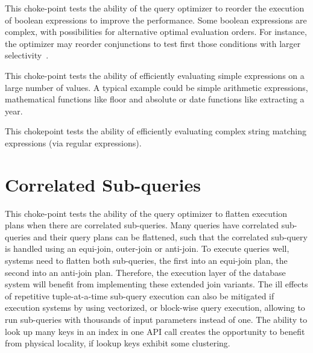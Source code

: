 


This choke-point tests the ability of the query optimizer to reorder the execution of boolean expressions to improve the performance. Some boolean expressions are complex, with possibilities for alternative optimal evaluation orders.
For instance, the optimizer may reorder conjunctions to test first those conditions with larger selectivity~\cite{DBLP:conf/vldb/Moerkotte98}.




This choke-point tests the ability of efficiently evaluating simple expressions on a large number of values. A typical example could be simple arithmetic expressions, mathematical functions like floor and absolute or date functions like extracting a year.




This chokepoint tests the ability of efficiently evaluating complex string
matching expressions (\eg via regular expressions).

%


\section{Correlated Sub-queries}


This choke-point tests the ability of the query optimizer to flatten execution plans when there are correlated sub-queries. Many queries have correlated sub-queries and their query plans can be flattened,
such that the correlated sub-query is handled using an equi-join, outer-join or anti-join. To execute queries well, systems need to flatten both sub-queries, the first into an equi-join plan, the second into an anti-join plan.
Therefore, the execution layer of the database system will benefit from implementing these extended join variants.
The ill effects of repetitive tuple-at-a-time sub-query execution can also be mitigated if execution systems by using vectorized, or block-wise query execution, allowing to run sub-queries with thousands of input parameters instead of one.
The ability to look up many keys in an index in one API call creates the opportunity to benefit from physical locality, if lookup keys exhibit some clustering.

